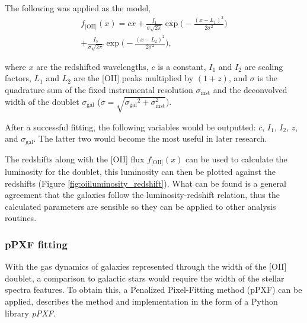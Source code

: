 \documentclass[12pt, twocolumn]{revtex4-1}    %
\begin{document}
The following was applied as the model,
\begin{multline}
f_{\text{[OII]}}(x) = cx + \frac{I_1}{\sigma \sqrt{2\pi}} \exp{\Bigg(-\frac{(x-L_1)^2}{2\sigma^2}\Bigg)} \\
+ \frac{I_2}{\sigma \sqrt{2\pi}} \exp{\Bigg(-\frac{(x-L_2)^2}{2\sigma^2}\Bigg)},
\label{eqn:doublet}
\end{multline} 

where $x$ are the redshifted wavelengths, ${c}$ is a constant, ${I_1}$ and ${I_2}$ are scaling factors, $L_1$ and $L_2$ are the [OII] peaks multiplied by $(1+{z})$, and $\sigma$ is the quadrature sum of the fixed instrumental resolution $\sigma_{\text{inst}}$ and the deconvolved width of the doublet $\sigma_{\text{gal}}$ ($\sigma=\sqrt{{\sigma_{\text{gal}}}^2 + \sigma_{\text{inst}}^2}$).



After a successful fitting, the following variables would be outputted: $c$, $I_1$, $I_2$, $z$, and $\sigma_{\text{gal}}$. The latter two would become the most useful in later research. 

The redshifts along with the [OII] flux $f_{\text{[OII]}}(x)$ can be used to calculate the luminosity for the doublet, this luminosity can then be plotted against the redshifts (Figure \ref{fig:oiiluminosity_redshift}). What can be found is a general agreement that the galaxies follow the luminosity-redshift relation, thus the calculated parameters are sensible so they can be applied to other analysis routines.

\subsubsection{pPXF fitting}

With the gas dynamics of galaxies represented through the width of the [OII] doublet, a comparison to galactic stars would require the width of the stellar spectra features. To obtain this, a Penalized Pixel-Fitting method (pPXF) can be applied, \cite{cappaellari_ppxf} describes the method and implementation in the form of a Python library \textit{pPXF}.
\end{document}
